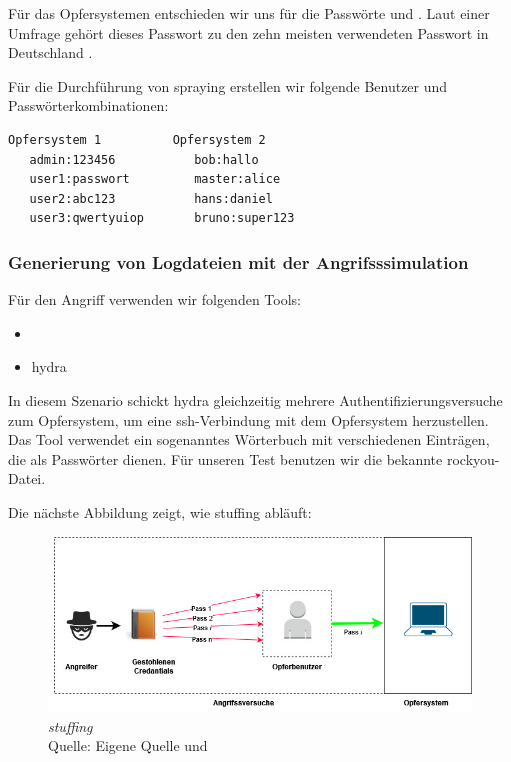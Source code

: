 Für das Opfersystemen entschieden wir uns für die Passwörte  und . Laut einer Umfrage gehört dieses Passwort zu den zehn meisten verwendeten Passwort in Deutschland \citep{silicon_passwort}.  

Für die Durchführung von \gls{spraying} erstellen wir folgende Benutzer und Passwörterkombinationen:

{
\begin{Verbatim}[frame=single]
   Opfersystem 1          Opfersystem 2  
   admin:123456           bob:hallo
   user1:passwort         master:alice
   user2:abc123           hans:daniel
   user3:qwertyuiop       bruno:super123
\end{Verbatim}
}

\newpage
\subsubsection{Generierung von Logdateien mit der Angrifsssimulation}
Für den Angriff verwenden wir folgenden Tools:

{
\begin{itemize}[noitemsep]
   \item	{}
   \item \gls{hydra}
\end{itemize}
}

In diesem Szenario schickt \gls{hydra} gleichzeitig mehrere Authentifizierungsversuche zum Opfersystem, um eine \gls{ssh}-Verbindung mit dem Opfersystem herzustellen. Das Tool verwendet ein sogenanntes Wörterbuch mit verschiedenen Einträgen, die als Passwörter dienen. Für unseren Test benutzen wir die bekannte \gls{rockyou}-Datei.

Die nächste Abbildung zeigt, wie \gls{stuffing} abläuft:

\begin{figure}[H]
   \centering
   \includegraphics[width=1\textwidth]{assets/Stuffing.jpg}
   \caption{\textit{\gls{stuffing}}\\Quelle: Eigene Quelle und \citep{Nguyen_stuffing}}
   \centering
\end{figure}

